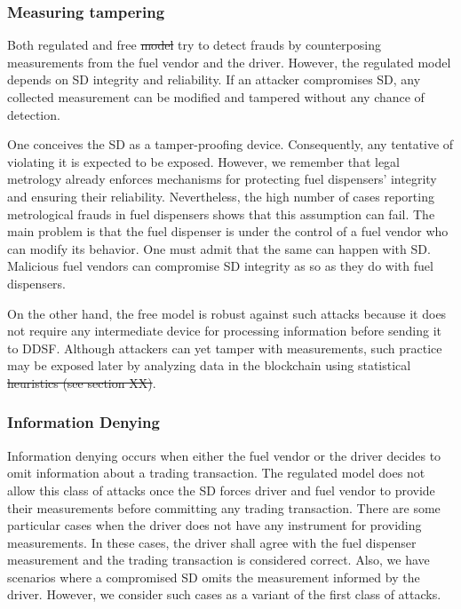 \documentclass[sigplan]{acmart}
\providecommand{\DIFadd}[1]{{\protect\color{blue}\uwave{#1}}} %
\providecommand{\DIFdel}[1]{{\protect\color{red}\sout{#1}}}                      %
\providecommand{\DIFaddbegin}{} %
\providecommand{\DIFaddend}{} %
\providecommand{\DIFdelbegin}{} %
\providecommand{\DIFdelend}{} %
\begin{document}
\subsubsection{Measuring tampering}
Both \DIFaddbegin \DIFadd{the }\DIFaddend regulated and free \DIFdelbegin \DIFdel{model }\DIFdelend \DIFaddbegin \DIFadd{models }\DIFaddend try to detect frauds by counterposing measurements from the fuel vendor and the driver.
However, the regulated model depends on SD integrity and reliability.
If an attacker compromises SD, any collected measurement can be modified and tampered without any chance of detection.

One conceives the SD as a tamper-proofing device.
Consequently, any tentative of violating it is expected to be exposed.
However, we remember that legal metrology already enforces mechanisms for protecting fuel dispensers' integrity and ensuring their reliability.
Nevertheless, the high number of cases reporting metrological frauds in fuel dispensers shows that this assumption can fail.
The main problem is that the fuel dispenser is under the control of a fuel vendor who can modify its behavior.
One must admit that the same can happen with SD.
Malicious fuel vendors can compromise SD integrity as so as they do with fuel dispensers.

On the other hand, the free model is robust against such attacks because it does not require any intermediate device for processing information before sending it to DDSF.
Although attackers can yet tamper with measurements, such practice may be exposed later by analyzing data in the blockchain using statistical \DIFdelbegin \DIFdel{heuristics (see section XX)}\DIFdelend \DIFaddbegin \DIFadd{tools}\DIFaddend .

\subsubsection{Information Denying}
Information denying occurs when either the fuel vendor or the driver decides to omit information about a trading transaction.
The regulated model does not allow this class of attacks once the SD forces driver and fuel vendor to provide their measurements before committing any trading transaction.
There are some particular cases when the driver does not have any instrument for providing measurements.
In these cases, the driver shall agree with the fuel dispenser measurement and the trading transaction is considered correct.
Also, we have scenarios where a compromised SD omits the measurement informed by the driver.
However, we consider such cases as a variant of the first class of attacks.
\end{document}
